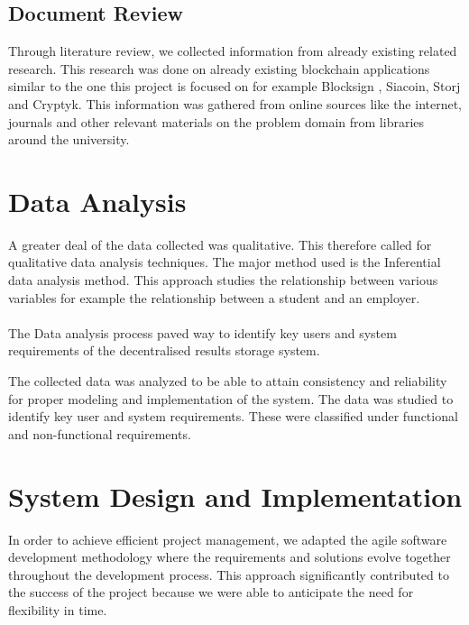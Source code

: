 \subsection{Document Review}
Through literature review, we collected information from already existing related research. This research was done on already existing blockchain applications similar to the one this project is focused on for example Blocksign \cite{art14}, Siacoin\cite{art15}, Storj\cite{art16} and Cryptyk\cite{art18}. This information was gathered from online sources like the internet, journals and other relevant materials on the problem domain from libraries around the university.


\section{Data Analysis}
A greater deal of the data collected was qualitative. This therefore called for qualitative data analysis techniques. The major method used is the Inferential data analysis method. This approach studies the relationship between various variables for example the relationship between a student and an employer.\\~\\
The Data analysis process paved way to identify key users and system requirements of the decentralised results storage system.

The collected data was analyzed to be able to attain consistency and reliability for proper modeling and implementation of the system. The data was studied to identify key user and system requirements. These were classified under functional and non-functional requirements.

\section{System Design and Implementation}
In order to achieve efficient project management, we adapted the agile software development methodology where the requirements and solutions evolve together throughout the development process. This approach significantly contributed to the success of the project because we were able to anticipate the need for flexibility in time. 

